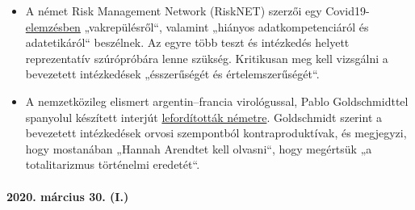 \begin{itemize}
{  ügyről}`` beszélt, ami az NPR újságírója szerint politikai nyomásra
  utalhat. Az ún. PCR-vírustesztek nagy hibaaránya e tanulmánytól
  függetlenül már régóta ismert: 2006-ban egy kanadai ápolóotthonban
  tömeges SARS-koronavírus-fertőzést mutattak ki, amelyről később
  \href{https://www.ncbi.nlm.nih.gov/pmc/articles/PMC2095096/}{kiderült},
  hogy sima meghűléses koronavírusról van szó.
\item
  A német Risk Management Network (RiskNET) szerzői egy
  Covid19-\href{https://www.risknet.de/themen/risknews/covid-19-und-der-blindflug/}{elemzésben}
  „vakrepülésről``, valamint „hiányos adatkompetenciáról és
  adatetikáról`` beszélnek. Az egyre több teszt és intézkedés helyett
  reprezentatív szúrópróbára lenne szükség. Kritikusan meg kell
  vizsgálni a bevezetett intézkedések „ésszerűségét és
  értelemszerűségét``.
\item
  A nemzetközileg elismert argentin--francia virológussal, Pablo
  Goldschmidttel spanyolul készített interjút
  \href{https://www.rubikon.news/artikel/der-corona-totalitarismus}{lefordították
  németre}. Goldschmidt szerint a bevezetett intézkedések orvosi
  szempontból kontraproduktívak, és megjegyzi, hogy mostanában „Hannah
  Arendtet kell olvasni``, hogy megértsük „a totalitarizmus történelmi
  eredetét``.
\end{itemize}

\hypertarget{2020-muxe1rcius-30-i}{%
\paragraph{2020. március 30. (I.)}\label{2020-muxe1rcius-30-i}}


